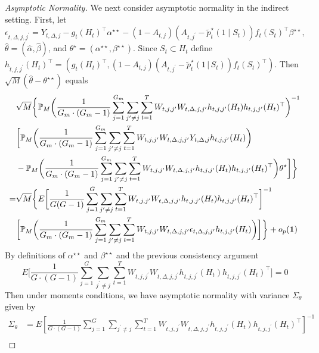 \documentclass[supplementary, lineno]{biometrika}
\def\given{\, | \,}
\begin{document}
\begin{proof}[Asymptotic Normality]
We next consider asymptotic normality in the indirect setting.  First, let
\[
\epsilon_{t,\Delta, j,j^\prime} = Y_{t,\Delta,j} - g_t(H_t)^\top \alpha^{\star \star} - (1 - A_{t,j})(A_{t,j^\prime}-\tilde{p}^\star_t(1 \mid S_t)) f_t(S_t)^{\top} \beta^{\star \star},
\]
$\hat{\theta} = (\hat{\alpha}, \hat{\beta})$, and $\theta^\star = (\alpha^{\star \star}, \beta^{\star \star})$.
Since $S_t \subset H_t$ define $h_{t,j,j^\prime}(H_t)^\top = (g_t(H_t)^\top, (1-A_{t,j}) (A_{t,j^\prime}-\tilde{p}^\star_t(1 \given S_t)) f_t(S_t)^\top)$. Then $\sqrt{M} ( \hat{\theta} - \theta^{\star \star} )$ equals
\begin{align*}
  &\sqrt{M} \bigg \{ \mathbb{P}_M \bigg( \frac{1}{G_m \cdot (G_m-1)} \sum_{j=1}^{G_m} \sum_{j^\prime \neq j} \sum_{t=1}^T W_{t,j,j^\prime} W_{t,\Delta, j,j^\prime}  h_{t,j,j^\prime}(H_t) h_{t,j,j^\prime}(H_t)^\top \bigg)^{-1} \\
  &\bigg[
    \mathbb{P}_M \bigg( \frac{1}{G_m \cdot (G_m - 1)} \sum_{j=1}^{G_m} \sum_{j^\prime \neq j} \sum_{t=1}^T W_{t,j,j^\prime}
    W_{t,\Delta,j,j^\prime} Y_{t,\Delta,j} h_{t,j,j^\prime}(H_t) \bigg)  \\
  &- \mathbb{P}_M \bigg( \frac{1}{G_m \cdot (G_m - 1)} \sum_{j=1}^{G_m}\sum_{j^\prime \neq j}
  \sum_{t=1}^T W_{t,j,j^\prime} W_{t,\Delta,j,j^\prime} h_{t,j, j^\prime}(H_t) h_{t,j, j^\prime}(H_t)^\top \bigg)
    \theta^\star \bigg] \bigg \} \\
  = &\sqrt{M} \bigg \{ E \bigg[
  \frac{1}{G (G-1)} \sum_{j=1}^G \sum_{j^\prime \neq j} \sum_{t=1}^T W_{t,j,j^\prime} W_{t,\Delta,j,j^\prime} h_{t,j, j^\prime}(H_t) h_{t,j, j^\prime}(H_t)^\top \bigg]^{-1} \\
  &\bigg[ \mathbb{P}_M \bigg( \frac{1}{G_m \cdot (G_m-1)} \sum_{j=1}^{G_m} \sum_{j^\prime \neq j} \sum_{t=1}^T W_{t,j,j^\prime} W_{t,\Delta,j,j^\prime} \epsilon_{t,\Delta, j, j^\prime} h_{t,j,j^\prime}(H_t) \bigg) \bigg] \bigg \} + o_p ( {\bf 1} )
\end{align*}
By definitions of $\alpha^{\star \star}$ and $\beta^{\star \star}$  and the previous consistency argument
\[
E \bigg[
  \frac{1}{G \cdot (G-1)} \sum_{j=1}^G \sum_{j^\prime \neq j} \sum_{t=1}^T W_{t,j,j^\prime} W_{t,\Delta,j,j^\prime} h_{t,j,j^\prime}(H_t)
  h_{t,j,j^\prime}(H_t)^\top \bigg]  = 0
\]
Then under moments conditions, we have asymptotic normality with variance $\Sigma_{\theta}$ given by
\begin{align*}
\Sigma_{\theta} &= E \left[ \frac{1}{G \cdot (G-1)} \sum_{j=1}^G \sum_{j^\prime \neq j} \sum_{t=1}^T W_{t,j,j^\prime}
W_{t,\Delta,j,j^\prime} h_{t,j,j^\prime}(H_t) h_{t,j,j^\prime}(H_t)^\top \right]^{-1} \\

\end{align*}
\end{proof}
\end{document}
